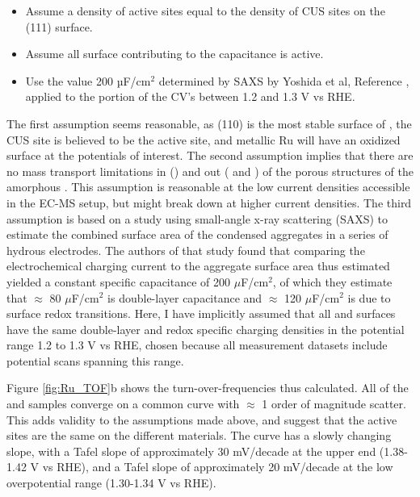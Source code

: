 \begin{itemize}
	
	\item Assume a density of active sites equal to the density of CUS sites on the (111) surface.
	
	\item Assume all surface contributing to the capacitance is active.
		
	\item Use the value 200 $µ$F/cm$^2$ determined by SAXS by Yoshida et al, Reference , applied to the portion of the CV's between 1.2 and 1.3 V vs RHE.
\end{itemize}

The first assumption seems reasonable, as (110) is the most stable surface of , the CUS site is believed to be the active site\cite{Reier2017, Rao2017a}, and metallic Ru will have an oxidized surface at the potentials of interest. The second assumption implies that there are no mass transport limitations in () and out ( and ) of the porous structures of the amorphous . This assumption is reasonable at the low current densities accessible in the EC-MS setup, but might break down at higher current densities. The third assumption is based on a study using small-angle x-ray scattering (SAXS) to estimate the combined surface area of the condensed  aggregates in a series of hydrous  electrodes\cite{Yoshida2013}. The authors of that study found that comparing the electrochemical charging current to the aggregate surface area thus estimated yielded a constant specific capacitance of 200 $\mu$F/cm$^2$, of which they estimate that $\approx$ 80 $\mu$F/cm$^2$ is double-layer capacitance and $\approx$ 120 $\mu$F/cm$^2$ is due to surface redox transitions. Here, I have implicitly assumed that all  and  surfaces have the same double-layer and redox specific charging densities in the potential range 1.2 to 1.3 V vs RHE, chosen because all measurement datasets include potential scans spanning this range.

Figure \ref{fig:Ru_TOF}b shows the turn-over-frequencies thus calculated. All of the  and  samples converge on a common curve with $\approx$ 1 order of magnitude scatter. This adds validity to the assumptions made above, and suggest that the active sites are the same on the different materials. The curve has a slowly changing slope, with a Tafel slope of approximately 30 mV/decade at the upper end (1.38-1.42 V vs RHE), and a Tafel slope of approximately 20 mV/decade at the low overpotential range (1.30-1.34 V vs RHE). 

